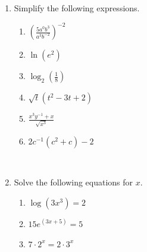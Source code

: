 \documentclass[12pt]{article}
\begin{document}
\begin{enumerate}
\item Simplify the following expressions. 
	\begin{multicols}{2}
	\begin{enumerate}[itemsep=2cm]
	\item $\displaystyle \left(\frac{5a^{0}b^{3}}{a^{3}b^{-2}}\right)^{-2}$
	
	\item $\displaystyle \ln\left(e^{2}\right)$
	
	\item $\displaystyle \log_{2}\left(\frac{1}{8}\right)$
	
	\item $\displaystyle \sqrt{t}(t^2-3t+2)$
	
	\item $\displaystyle \frac{x^3y^{-1}+x}{\sqrt{x^3}}$
	
	\item $\displaystyle 2c^{-1}(c^2+c)-2$
	\end{enumerate}
	\end{multicols}
\newpage

~
\item Solve the following equations for $x$.
	\begin{multicols}{2}
	\begin{enumerate}[itemsep=4cm]
	\item $\displaystyle \log\left(3x^{3}\right)=2$
	
	\item $\displaystyle 15e^{\left(3x+5\right)}=5$
	
	\item $\displaystyle 7\cdot2^{x}=2\cdot3^{x}$
	

\end{enumerate}
\end{multicols}
\end{enumerate}
\end{document}
